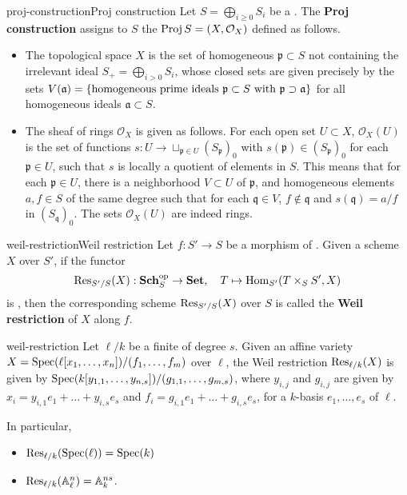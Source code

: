 \begin{topic}{proj-construction}{Proj construction}
    Let $S = \bigoplus_{i \ge 0} S_i$ be a . The \textbf{Proj construction} assigns to $S$ the  $\Proj S = (X, \mathcal{O}_X)$ defined as follows.
    \begin{itemize}
        \item The topological space $X$ is the set of homogeneous  $\mathfrak{p} \subset S$ not containing the irrelevant ideal $S_+ = \bigoplus_{i > 0} S_i$, whose closed sets are given precisely by the sets $V(\mathfrak{a}) = \{ \textup{homogeneous prime ideals } \mathfrak{p} \subset S \textup{ with } \mathfrak{p} \supset \mathfrak{a} \}$ for all homogeneous ideals $\mathfrak{a} \subset S$.
        \item The sheaf of rings $\mathcal{O}_X$ is given as follows. For each open set $U \subset X$, $\mathcal{O}_X(U)$ is the set of functions $s : U \to \sqcup_{\mathfrak{p} \in U} {(S_\mathfrak{p})}_0$ with $s(\mathfrak{p}) \in (S_\mathfrak{p})_0$ for each $\mathfrak{p} \in U$, such that $s$ is locally a quotient of elements in $S$. This means that for each $\mathfrak{p} \in U$, there is a neighborhood $V \subset U$ of $\mathfrak{p}$, and homogeneous elements $a, f \in S$ of the same degree such that for each $\mathfrak{q} \in V$, $f \not\in \mathfrak{q}$ and $s(\mathfrak{q}) = a / f$ in $(S_\mathfrak{q})_0$. The sets $\mathcal{O}_X(U)$ are indeed rings.
    \end{itemize}
\end{topic}

\begin{topic}{weil-restriction}{Weil restriction}
    Let $f : S' \to S$ be a morphism of . Given a scheme $X$ over $S'$, if the functor
    \[ \textup{Res}_{S'/S}(X) : \textbf{Sch}_S^\textup{op} \to \textbf{Set}, \quad T \mapsto \Hom_{S'}(T \times_S S', X) \]
    is , then the corresponding scheme $\textup{Res}_{S'/S}(X)$ over $S$ is called the \textbf{Weil restriction} of $X$ along $f$.
\end{topic}

\begin{example}{weil-restriction}
    Let $\ell/k$ be a finite  of degree $s$. Given an affine variety $X = \Spec(\ell[x_1, \ldots, x_n]) / (f_1, \ldots, f_m)$ over $\ell$, the Weil restriction $\textup{Res}_{\ell/k}(X)$ is given by $\Spec(k[y_{1, 1}, \ldots, y_{n, s}]) / (g_{1, 1}, \ldots, g_{m, s})$, where $y_{i, j}$ and $g_{i, j}$ are given by $x_i = y_{i, 1} e_1 + \ldots + y_{i, s} e_s$ and $f_i = g_{i, 1} e_1 + \ldots + g_{i, s} e_s$, for a $k$-basis $e_1, \ldots, e_s$ of $\ell$.
    
    In particular,
    \begin{itemize}
        \item $\textup{Res}_{\ell/k}(\Spec(\ell)) = \Spec(k)$
        \item $\textup{Res}_{\ell/k}(\AA^n_\ell) = \AA^{ns}_k$.
    \end{itemize}
\end{example}

